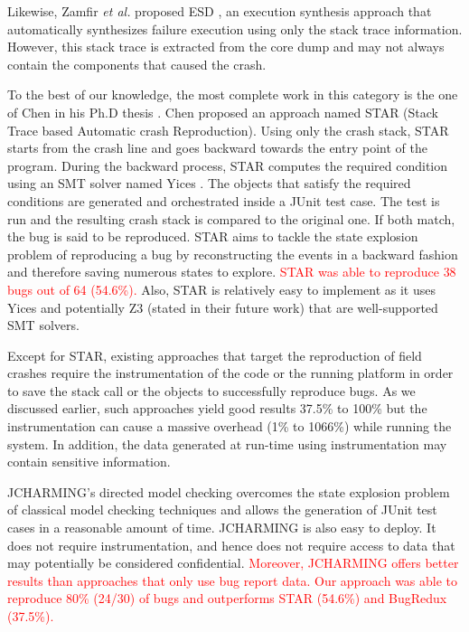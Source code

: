 \documentclass[times, doublespace]{smrauth}
\newcommand{\red}[1]{\textcolor{red}{#1}}
\begin{document}
Likewise, Zamfir {\it et al.} proposed ESD \cite{Zamfir2010}, an execution synthesis approach that automatically synthesizes failure execution using only the stack trace information. However, this stack trace is extracted from the core dump and may not always contain the components that caused the crash.

To the best of our knowledge, the most complete work in this category is the one of Chen in his Ph.D thesis \cite{Chen2013a}. Chen proposed an approach named STAR (Stack Trace based Automatic crash Reproduction). Using only the crash stack, STAR starts from the crash line and goes backward towards the entry point of the program. During the backward process, STAR computes the required condition using an SMT solver named Yices \cite{Dutertre2006}. The objects that satisfy the required conditions are generated and orchestrated inside a JUnit test case. The test is run and the resulting crash stack is compared to the original one. If both match, the bug is said to be reproduced. STAR aims to tackle the state explosion problem of reproducing a bug by reconstructing the events in a backward fashion and therefore saving numerous states to explore. \red{STAR was able to reproduce 38 bugs out of 64 (54.6\%).}
Also, STAR is relatively easy to implement as it uses Yices \cite{Dutertre2006} and potentially Z3 \cite{de2008z3} (stated in their future work) that are well-supported SMT solvers.

Except for STAR, existing approaches that target the reproduction of
field crashes require the instrumentation of the code or the running
platform in order to save the stack call or the objects to successfully
reproduce bugs. As we discussed earlier, such approaches yield good results 37.5\% to 100\% but the instrumentation can cause a massive
overhead (1\% to 1066\%) while running the system.
In addition, the data generated at run-time using instrumentation
may contain sensitive information.

JCHARMING's directed model checking overcomes the state explosion problem of
classical model checking techniques and allows the generation of
JUnit test cases in a reasonable amount of time.
JCHARMING is also easy to deploy. It does not require instrumentation,
and hence does not require access to data that may potentially
be considered confidential.
\red{Moreover, JCHARMING offers better results than approaches that only use bug report data.
Our approach was able to reproduce 80\% (24/30) of bugs and outperforms STAR (54.6\%) and BugRedux (37.5\%).}
\end{document}
